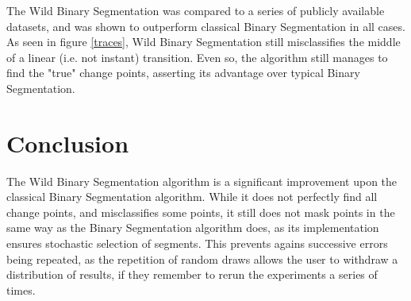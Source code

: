\documentclass[%
 reprint,
 amsmath,amssymb,
 aps,
]{revtex4-1}
\begin{document}
The Wild Binary Segmentation was compared to a series of publicly available datasets, and was shown to outperform classical Binary Segmentation in all cases.
As seen in figure \ref{traces}, Wild Binary Segmentation still misclassifies the middle of a linear (i.e. not instant) transition.
Even so, the algorithm still manages to find the "true" change points, asserting its advantage over typical Binary Segmentation.


\section{Conclusion}
The Wild Binary Segmentation algorithm is a significant improvement upon the classical Binary Segmentation algorithm.
While it does not perfectly find all change points, and misclassifies some points, it still does not mask points in the same way as the Binary Segmentation algorithm does, as its implementation ensures stochastic selection of segments.
This prevents agains successive errors being repeated, as the repetition of random draws allows the user to withdraw a distribution of results, if they remember to rerun the experiments a series of times.
\end{document}
